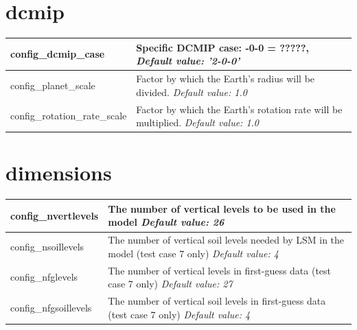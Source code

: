 \documentclass[11pt]{report}
\begin{document}
\section{dcmip}

{\small
\begin{longtable}{|p{1.5in} |p{4.75in}|}
 \hline
   config\_dcmip\_case & Specific DCMIP case: \newline
                                        2-0-0 = ?????, \newline
                                         {\em Default value: '2-0-0'} \\ \hline
                                        
   config\_planet\_scale & Factor by which the Earth's radius will be divided. \newline 
   {\em Default value: 1.0} \\ \hline
                                      
   config\_rotation\_rate\_scale & Factor by which the Earth's rotation rate will be multiplied. \newline 
   {\em Default value: 1.0} \\ \hline   
   
\end{longtable}
}


\section{dimensions}

{\small
\begin{longtable}{|p{1.25in} |p{5.0in}|}
 \hline
   config\_nvertlevels     & The number of vertical levels to be used in the model \newline 
   {\em Default value: 26} \\ \hline
   
   config\_nsoillevels     & The number of vertical soil levels needed by LSM in the model (test case 7 only) \newline 
   {\em Default value: 4} \\ \hline
   
   config\_nfglevels       & The number of vertical levels in first-guess data (test case 7 only) \newline 
   {\em Default value: 27} \\ \hline
   
   config\_nfgsoillevels   & The number of vertical soil levels in first-guess data (test case 7 only) \newline 
   {\em Default value: 4} \\ \hline
\end{longtable}
}
\end{document}
